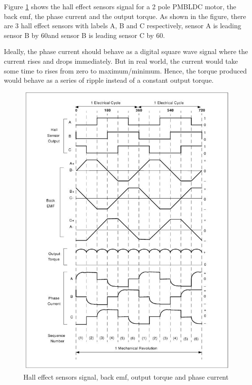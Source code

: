 Figure \ref{im:signals} shows the hall effect sensors signal for a 2 pole PMBLDC motor, the back emf, the phase current and the output torque. As shown in the figure, there are 3 hall effect sensors with labels A, B and C respectively, sensor A is leading sensor B by 60\textdegree and sensor B is leading sensor C by 60\textdegree. 


Ideally, the phase current should behave as a digital square wave signal where the current rises and drops immediately. But in real world, the current would take some time to rises from zero to maximum/minimum. Hence, the torque produced would behave as a series of ripple instead of a constant output torque.

\begin{figure}
	\centering
	\includegraphics[width=5.5in]{images/signal.jpg}
	\caption{Hall effect sensors signal, back emf, output torque and phase current \citep{an885}}
	\label{im:signals}
\end{figure}

